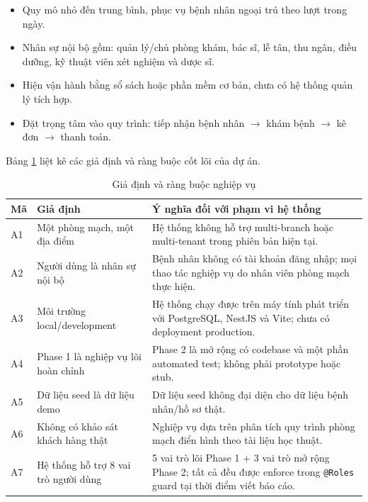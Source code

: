 \begin{itemize}
    \item Quy mô nhỏ đến trung bình, phục vụ bệnh nhân ngoại trú theo lượt trong ngày.
    \item Nhân sự nội bộ gồm: quản lý/chủ phòng khám, bác sĩ, lễ tân, thu ngân, điều dưỡng, kỹ thuật viên xét nghiệm và dược sĩ.
    \item Hiện vận hành bằng sổ sách hoặc phần mềm cơ bản, chưa có hệ thống quản lý tích hợp.
    \item Đặt trọng tâm vào quy trình: tiếp nhận bệnh nhân $\rightarrow$ khám bệnh $\rightarrow$ kê đơn $\rightarrow$ thanh toán.
\end{itemize}

Bảng \ref{tab:srs-assumptions} liệt kê các giả định và ràng buộc cốt lõi của dự án.

\begin{table}[H]
\centering
\caption{Giả định và ràng buộc nghiệp vụ}
\label{tab:srs-assumptions}
\begin{tabularx}{\textwidth}{|p{1.4cm}|p{4.2cm}|X|}
\hline
\textbf{Mã} & \textbf{Giả định} & \textbf{Ý nghĩa đối với phạm vi hệ thống} \\
\hline
A1 & Một phòng mạch, một địa điểm & Hệ thống không hỗ trợ multi-branch hoặc multi-tenant trong phiên bản hiện tại. \\
\hline
A2 & Người dùng là nhân sự nội bộ & Bệnh nhân không có tài khoản đăng nhập; mọi thao tác nghiệp vụ do nhân viên phòng mạch thực hiện. \\
\hline
A3 & Môi trường local/development & Hệ thống chạy được trên máy tính phát triển với PostgreSQL, NestJS và Vite; chưa có deployment production. \\
\hline
A4 & Phase 1 là nghiệp vụ lõi hoàn chỉnh & Phase 2 là mở rộng có codebase và một phần automated test; không phải prototype hoặc stub. \\
\hline
A5 & Dữ liệu seed là dữ liệu demo & Dữ liệu seed không đại diện cho dữ liệu bệnh nhân/hồ sơ thật. \\
\hline
A6 & Không có khảo sát khách hàng thật & Nghiệp vụ dựa trên phân tích quy trình phòng mạch điển hình theo tài liệu học thuật. \\
\hline
A7 & Hệ thống hỗ trợ 8 vai trò người dùng & 5 vai trò lõi Phase 1 + 3 vai trò mở rộng Phase 2; tất cả đều được enforce trong \texttt{@Roles} guard tại thời điểm viết báo cáo. \\
\hline
\end{tabularx}
\end{table}

